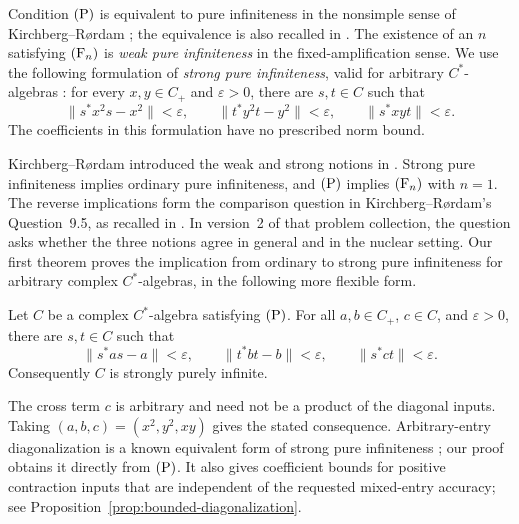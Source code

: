 Condition \(\textup{(P)}\) is equivalent to pure infiniteness in the
nonsimple sense of Kirchberg--R{\o}rdam
\cite[Theorem~4.16]{KR2000}; the equivalence is also recalled in
\cite[Section~21]{STW99problems}.  The existence of an
\(n\) satisfying \(\textup{(F\ensuremath{_n})}\) is \emph{weak pure infiniteness} in the
fixed-amplification sense.  We use the following formulation of
\emph{strong pure infiniteness}, valid for arbitrary \(C^*\)-algebras
\cite[Definition~3.1]{KS}: for every \(x,y\in C_+\) and
\(\varepsilon>0\), there are \(s,t\in C\) such that
\begin{equation}\label{eq:SPI-definition}
 \|s^*x^2s-x^2\|<\varepsilon,\qquad
 \|t^*y^2t-y^2\|<\varepsilon,\qquad
 \|s^*xy t\|<\varepsilon.
\end{equation}
The coefficients in this formulation have no prescribed norm bound.

Kirchberg--R{\o}rdam introduced the weak and strong notions in
\cite{KR2002}.  Strong pure infiniteness implies ordinary pure
infiniteness, and \(\textup{(P)}\) implies \(\textup{(F\ensuremath{_n})}\) with \(n=1\).
The reverse implications form the comparison question in
Kirchberg--R{\o}rdam's Question~9.5, as recalled in
\cite[Section~21, Problem~LXXII]{STW99problems}.  In version~2 of that problem collection, the question asks whether
the three notions agree in general and in the nuclear setting.
Our first theorem proves the implication from ordinary to strong
pure infiniteness for arbitrary complex \(C^*\)-algebras, in the
following more flexible form.

\begin{theorem}\label{thm:individual-to-strong}
Let \(C\) be a complex \(C^*\)-algebra satisfying \(\textup{(P)}\).
For all \(a,b\in C_+\), \(c\in C\), and \(\varepsilon>0\), there are
\(s,t\in C\) such that
\begin{equation}\label{eq:main-diagonalization}
 \|s^*as-a\|<\varepsilon,\qquad
 \|t^*bt-b\|<\varepsilon,\qquad
 \|s^*ct\|<\varepsilon.
\end{equation}
Consequently \(C\) is strongly purely infinite.
\end{theorem}

The cross term \(c\) is arbitrary and need not be a product of the
diagonal inputs.  Taking \((a,b,c)=(x^2,y^2,xy)\) gives the stated
consequence.  Arbitrary-entry diagonalization is a known equivalent
form of strong pure infiniteness
\cite[Remarks~3.2(i)--(ii)]{KS}; our proof obtains it directly from
\(\textup{(P)}\).  It also gives coefficient bounds for positive
contraction inputs that are independent of the requested mixed-entry
accuracy; see Proposition~\ref{prop:bounded-diagonalization}.

